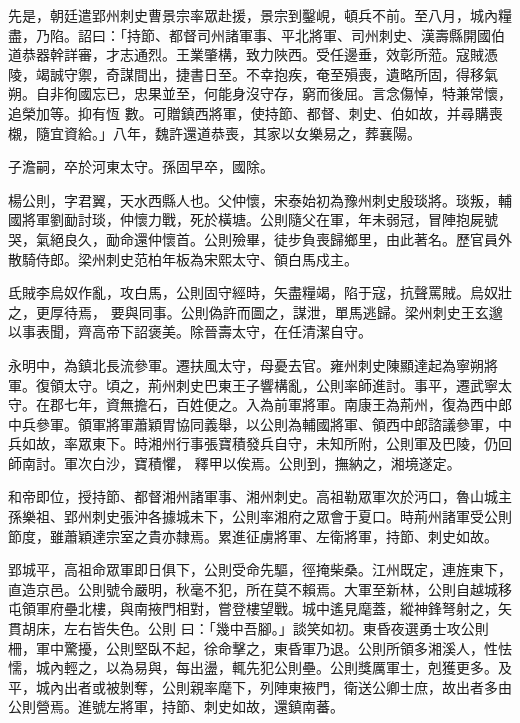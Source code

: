 \begin{pinyinscope}
 先是，朝廷遣郢州刺史曹景宗率眾赴援，景宗到鑿峴，頓兵不前。至八月，城內糧盡，乃陷。詔曰：「持節、都督司州諸軍事、平北將軍、司州刺史、漢壽縣開國伯道恭器幹詳審，才志通烈。王業肇構，致力陜西。受任邊垂，效彰所蒞。寇賊憑陵，竭誠守禦，奇謀間出，捷書日至。不幸抱疾，奄至殞喪，遺略所固，得移氣朔。自非徇國忘已，忠果並至，何能身沒守存，窮而後屈。言念傷悼，特兼常懷，追榮加等。抑有恆
 數。可贈鎮西將軍，使持節、都督、刺史、伯如故，并尋購喪櫬，隨宜資給。」八年，魏許還道恭喪，其家以女樂易之，葬襄陽。



 子澹嗣，卒於河東太守。孫固早卒，國除。



 楊公則，字君翼，天水西縣人也。父仲懷，宋泰始初為豫州刺史殷琰將。琰叛，輔國將軍劉勔討琰，仲懷力戰，死於橫塘。公則隨父在軍，年未弱冠，冒陣抱屍號哭，氣絕良久，勔命還仲懷首。公則殮畢，徒步負喪歸鄉里，由此著名。歷官員外散騎侍郎。梁州刺史范柏年板為宋熙太守、領白馬戍主。



 氐賊李烏奴作亂，攻白馬，公則固守經時，矢盡糧竭，陷于寇，抗聲罵賊。烏奴壯之，更厚待焉，
 要與同事。公則偽許而圖之，謀泄，單馬逃歸。梁州刺史王玄邈以事表聞，齊高帝下詔褒美。除晉壽太守，在任清潔自守。



 永明中，為鎮北長流參軍。遷扶風太守，母憂去官。雍州刺史陳顯達起為寧朔將軍。復領太守。頃之，荊州刺史巴東王子響構亂，公則率師進討。事平，遷武寧太守。在郡七年，資無擔石，百姓便之。入為前軍將軍。南康王為荊州，復為西中郎中兵參軍。領軍將軍蕭穎胃協同義舉，以公則為輔國將軍、領西中郎諮議參軍，中兵如故，率眾東下。時湘州行事張寶積發兵自守，未知所附，公則軍及巴陵，仍回師南討。軍次白沙，寶積懼，
 釋甲以俟焉。公則到，撫納之，湘境遂定。



 和帝即位，授持節、都督湘州諸軍事、湘州刺史。高祖勒眾軍次於沔口，魯山城主孫樂祖、郢州刺史張沖各據城未下，公則率湘府之眾會于夏口。時荊州諸軍受公則節度，雖蕭穎達宗室之貴亦隸焉。累進征虜將軍、左衛將軍，持節、刺史如故。



 郢城平，高祖命眾軍即日俱下，公則受命先驅，徑掩柴桑。江州既定，連旌東下，直造京邑。公則號令嚴明，秋毫不犯，所在莫不賴焉。大軍至新林，公則自越城移屯領軍府壘北樓，與南掖門相對，嘗登樓望戰。城中遙見麾蓋，縱神鋒弩射之，矢貫胡床，左右皆失色。公則
 曰：「幾中吾腳。」談笑如初。東昏夜選勇士攻公則柵，軍中驚擾，公則堅臥不起，徐命擊之，東昏軍乃退。公則所領多湘溪人，性怯懦，城內輕之，以為易與，每出盪，輒先犯公則壘。公則獎厲軍士，剋獲更多。及平，城內出者或被剝奪，公則親率麾下，列陣東掖門，衛送公卿士庶，故出者多由公則營焉。進號左將軍，持節、刺史如故，還鎮南蕃。




\end{pinyinscope}
